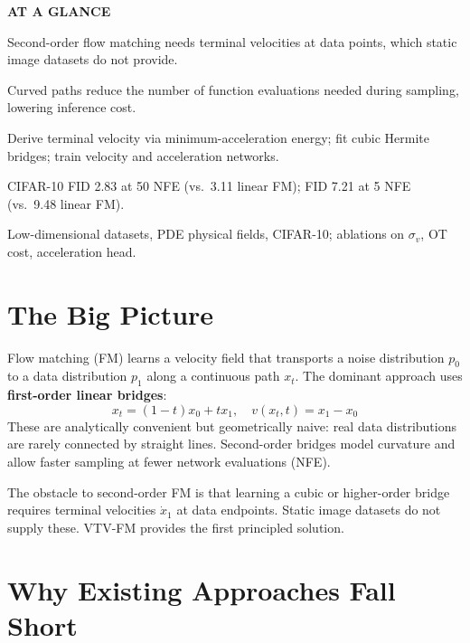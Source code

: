 \documentclass[10pt,twocolumn]{article}
\begin{document}
\begin{mdframed}[backgroundcolor=boxgray,linecolor=rulered,linewidth=1pt,
    innerleftmargin=6pt,innerrightmargin=6pt,
    innertopmargin=6pt,innerbottommargin=6pt]
\textbf{\small AT A GLANCE}\par\vspace{4pt}
\begin{description}[leftmargin=0pt,labelsep=4pt,itemsep=2pt,parsep=0pt,
    font=\small\bfseries]
  \item[Problem:] Second-order flow matching needs terminal velocities at data
    points, which static image datasets do not provide.
  \item[Why it matters:] Curved paths reduce the number of function evaluations
    needed during sampling, lowering inference cost.
  \item[Method:] Derive terminal velocity via minimum-acceleration energy;
    fit cubic Hermite bridges; train velocity and acceleration networks.
  \item[Result:] CIFAR-10 FID 2.83 at 50 NFE (vs.\ 3.11 linear FM); FID 7.21
    at 5 NFE (vs.\ 9.48 linear FM).
  \item[Evidence:] Low-dimensional datasets, PDE physical fields, CIFAR-10;
    ablations on $\sigma_v$, OT cost, acceleration head.
\end{description}
\end{mdframed}

\section{The Big Picture}

Flow matching (FM) learns a velocity field that transports a noise distribution
$p_0$ to a data distribution $p_1$ along a continuous path $x_t$. The dominant
approach uses \textbf{first-order linear bridges}:
\[
x_t = (1-t)x_0 + t x_1,\quad v(x_t,t) = x_1 - x_0
\]
These are analytically convenient but geometrically naive: real data distributions
are rarely connected by straight lines. Second-order bridges model curvature and
allow faster sampling at fewer network evaluations (NFE).

The obstacle to second-order FM is that learning a cubic or higher-order bridge
requires terminal velocities $\dot{x}_1$ at data endpoints. Static image datasets
do not supply these. VTV-FM provides the first principled solution.

\section{Why Existing Approaches Fall Short}
\end{document}
